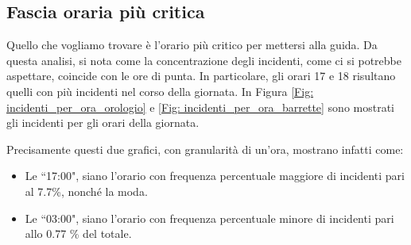 \documentclass[12pt,a4paper,final,oneside]{article}			%
\begin{document}
    \subsection{Fascia oraria più critica}
        Quello che vogliamo trovare è l’orario più critico per mettersi alla guida. Da questa analisi, si nota come la concentrazione degli incidenti, come ci si potrebbe aspettare, coincide con le ore di punta. In particolare, gli orari 17 e 18 risultano quelli con più incidenti nel corso della giornata. In Figura \ref{Fig: incidenti_per_ora_orologio} e \ref{Fig: incidenti_per_ora_barrette} sono mostrati gli incidenti per gli orari della giornata.
        
        Precisamente questi due grafici, con granularità di un’ora, mostrano infatti come:
        \begin{itemize}
            \item Le ``17:00",  siano l’orario con frequenza percentuale maggiore di incidenti pari al  7.7\%, nonché la moda. 
            \item Le ``03:00", siano l’orario con frequenza percentuale minore di incidenti pari allo 0.77 \% del totale.
        \end{itemize}
        
\end{document}
